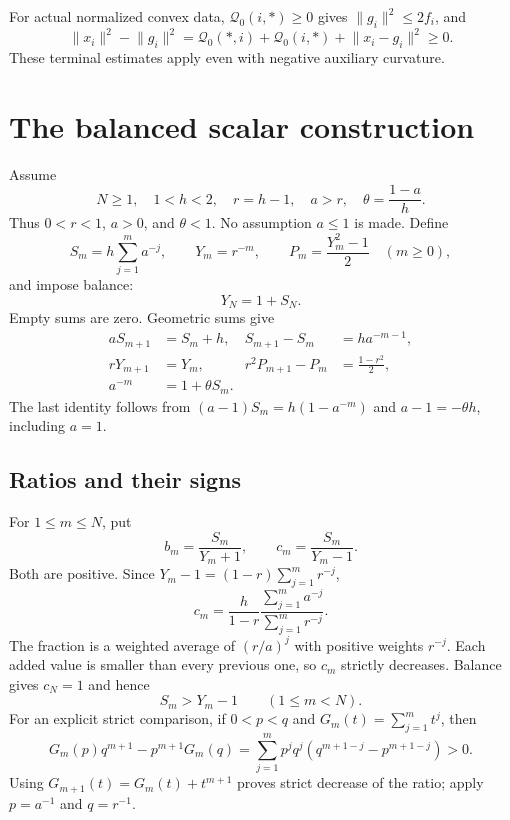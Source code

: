 \documentclass[11pt]{article}
\numberwithin{equation}{section}
\theoremstyle{remark}
\newcommand{\norm}[1]{\lVert #1\rVert}
\newcommand{\Q}{\mathcal Q}
\begin{document}
For actual normalized convex data, $\Q_0(i,*)\geq0$ gives
$\norm{g_i}^2\leq2f_i$, and
\begin{equation}
\norm{x_i}^2-\norm{g_i}^2
=\Q_0(*,i)+\Q_0(i,*)+\norm{x_i-g_i}^2\geq0.
\label{eq:terminal-bounds}
\end{equation}
These terminal estimates apply even with negative auxiliary curvature.

\section{The balanced scalar construction}

Assume
\begin{equation}
N\geq1,\quad 1<h<2,\quad r=h-1,\quad a>r,\quad
\theta=\frac{1-a}{h}.
\label{eq:balanced-parameters}
\end{equation}
Thus $0<r<1$, $a>0$, and $\theta<1$. No assumption $a\leq1$ is made.
Define
\begin{equation}
S_m=h\sum_{j=1}^{m}a^{-j},\qquad
Y_m=r^{-m},\qquad P_m=\frac{Y_m^2-1}{2}\quad(m\geq0),
\label{eq:scalar-sequences}
\end{equation}
and impose balance:
\begin{equation}
Y_N=1+S_N.
\label{eq:balance}
\end{equation}
Empty sums are zero. Geometric sums give
\begin{align}
aS_{m+1}&=S_m+h,& S_{m+1}-S_m&=ha^{-m-1},\label{eq:S-rec}\\
rY_{m+1}&=Y_m,& r^2P_{m+1}-P_m&=\frac{1-r^2}{2},\label{eq:P-rec}\\
a^{-m}&=1+\theta S_m.&&\label{eq:A-identity}
\end{align}
The last identity follows from
$(a-1)S_m=h(1-a^{-m})$ and $a-1=-\theta h$, including $a=1$.

\subsection{Ratios and their signs}

For $1\leq m\leq N$, put
\begin{equation}
b_m=\frac{S_m}{Y_m+1},\qquad c_m=\frac{S_m}{Y_m-1}.
\label{eq:bc}
\end{equation}
Both are positive. Since
$Y_m-1=(1-r)\sum_{j=1}^{m}r^{-j}$,
\begin{equation}
c_m=\frac{h}{1-r}
 \frac{\sum_{j=1}^{m}a^{-j}}{\sum_{j=1}^{m}r^{-j}}.
\label{eq:c-average}
\end{equation}
The fraction is a weighted average of $(r/a)^j$ with positive
weights $r^{-j}$. Each added value is smaller than every previous one,
so $c_m$ strictly decreases. Balance gives $c_N=1$ and hence
\begin{equation}
S_m>Y_m-1\qquad(1\leq m<N).
\label{eq:prefix-gap}
\end{equation}
For an explicit strict comparison, if $0<p<q$ and
$G_m(t)=\sum_{j=1}^{m}t^j$, then
\[
G_m(p)q^{m+1}-p^{m+1}G_m(q)
=\sum_{j=1}^{m}p^jq^j(q^{m+1-j}-p^{m+1-j})>0.
\]
Using $G_{m+1}(t)=G_m(t)+t^{m+1}$ proves strict decrease of the
ratio; apply $p=a^{-1}$ and $q=r^{-1}$.
\end{document}
